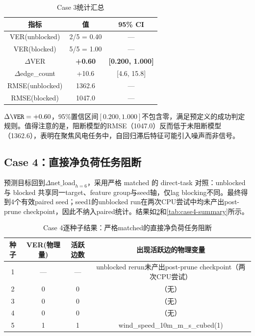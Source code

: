 \begin{table}[htbp]
\centering
\caption{Case 3统计汇总}
\label{tab:case3-summary}
\begin{tabular}{ccc}
\toprule
指标 & 值 & 95\% CI \\
\midrule
VER(unblocked) & 2/5 = 0.40 & — \\
VER(blocked) & 5/5 = 1.00 & — \\
$\Delta$VER & \textbf{+0.60} & \textbf{[0.200, 1.000]} \\
$\Delta$edge\_count & +10.6 & [4.6, 15.8] \\
RMSE(unblocked) & 1362.6 & — \\
RMSE(blocked) & 1047.0 & — \\
\bottomrule
\end{tabular}
\end{table}

$\Delta\VER=+0.60$，95\%置信区间$[0.200, 1.000]$不包含零，满足预定义的成功判定规则。值得注意的是，阻断模型的RMSE（1047.0）反而低于未阻断模型（1362.6），表明在聚焦风电任务中，自回归滞后特征可能引入噪声而非信号。

\subsection{Case 4：直接净负荷任务阻断}

预测目标回到$\Delta\text{net\_load}_{h=6}$，采用严格 matched 的 direct-task 对照：unblocked 与 blocked 共享同一target、feature group与seed轴，仅lag blocking不同。最终得到4个有效paired seed；seed1的unblocked run在两次CPU尝试中均未产出post-prune checkpoint，因此不纳入paired统计。结果如\cref{tab:case4-detail}和\cref{tab:case4-summary}所示。

\begin{table}[htbp]
\centering
\caption{Case 4逐种子结果：严格matched的直接净负荷任务阻断}
\label{tab:case4-detail}
\begin{tabular}{cccc}
\toprule
种子 & VER(物理量) & 活跃边数 & 出现活跃边的物理变量 \\
\midrule
1 & — & — & unblocked rerun未产出post-prune checkpoint（两次CPU尝试） \\
2 & 0 & 0 & （无） \\
3 & 0 & 0 & （无） \\
4 & 0 & 0 & （无） \\
5 & 1 & 1 & wind\_speed\_10m\_m\_s\_cubed(1) \\
\bottomrule
\end{tabular}
\end{table}

